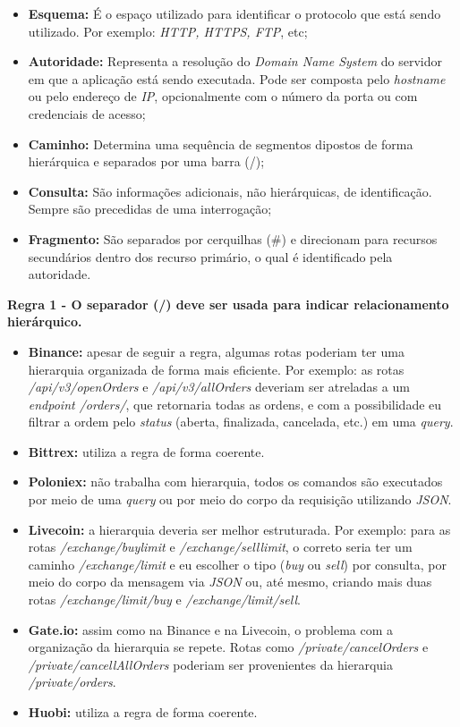 \begin{itemize}
    \item \textbf{Esquema:} É o espaço utilizado para identificar o protocolo que está sendo utilizado. Por exemplo: \textit{HTTP, HTTPS, FTP}, etc;
    \item \textbf{Autoridade:} Representa a resolução do \textit{Domain Name System} do servidor em que a aplicação está sendo executada. Pode ser composta pelo \textit{hostname} ou pelo endereço de \textit{IP}, opcionalmente com o número da porta ou com credenciais de acesso;
    \item \textbf{Caminho:} Determina uma sequência de segmentos dipostos de forma hierárquica e separados por uma barra (/);
    \item \textbf{Consulta:} São informações adicionais, não hierárquicas, de identificação. Sempre são precedidas de uma interrogação;
    \item \textbf{Fragmento:} São separados por cerquilhas (\#) e direcionam para recursos secundários dentro dos recurso primário, o qual é identificado pela autoridade.
\end{itemize}

\textbf{Regra 1 - O separador (/) deve ser usada para indicar relacionamento hierárquico.}

\begin{itemize}
    \item \textbf{Binance:} apesar de seguir a regra, algumas rotas poderiam ter uma hierarquia organizada de forma mais eficiente. Por exemplo: as rotas \textit{/api/v3/openOrders} e \textit{/api/v3/allOrders} deveriam ser atreladas a um \textit{endpoint /orders/}, que retornaria todas as ordens, e com a possibilidade eu filtrar a ordem pelo \textit{status} (aberta, finalizada, cancelada, etc.) em uma \textit{query}.
    \item \textbf{Bittrex:} utiliza a regra de forma coerente.
    \item \textbf{Poloniex:} não trabalha com hierarquia, todos os comandos são executados por meio de uma \textit{query} ou por meio do corpo da requisição utilizando \textit{JSON}.
    \item \textbf{Livecoin:} a hierarquia deveria ser melhor estruturada. Por exemplo: para as rotas \textit{/exchange/buylimit} e \textit{/exchange/selllimit}, o correto seria ter um caminho \textit{/exchange/limit} e eu escolher o tipo (\textit{buy} ou \textit{sell}) por consulta, por meio do corpo da mensagem via \textit{JSON} ou, até mesmo, criando mais duas rotas \textit{/exchange/limit/buy} e \textit{/exchange/limit/sell}.
    \item \textbf{Gate.io:} assim como na Binance e na Livecoin, o problema com a organização da hierarquia se repete. Rotas como \textit{/private/cancelOrders} e \textit{/private/cancellAllOrders} poderiam ser provenientes da hierarquia \textit{/private/orders}.
    \item \textbf{Huobi:} utiliza a regra de forma coerente.
\end{itemize}

